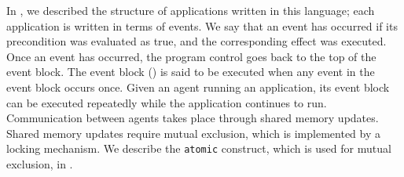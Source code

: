 In , we described the structure of applications written in this language; each application is written in terms of events. We say that an event has occurred if its precondition was evaluated as true, and the corresponding effect was executed. Once an event has occurred, the program control goes back to the top of the event block. The event block () is said to be executed when any event in the event block occurs once. Given an agent running an application, its event block can be executed repeatedly while the application continues to run. Communication between agents takes place through shared memory updates. Shared memory updates require mutual exclusion, which is implemented by a locking mechanism. We describe the \verb|atomic| construct, which is used for mutual exclusion, in .
